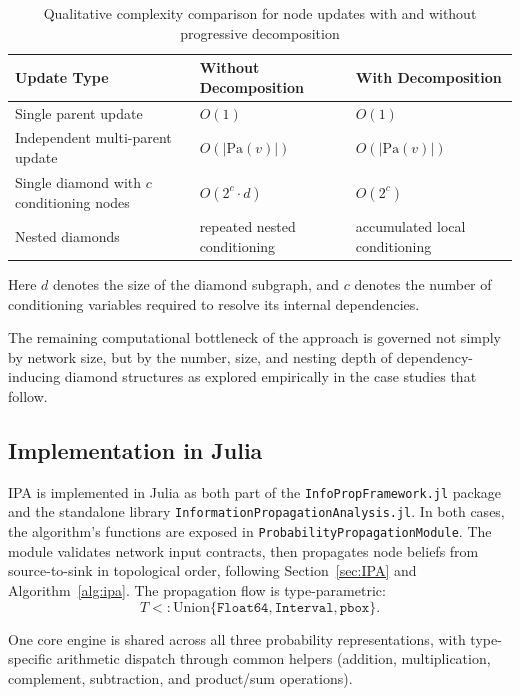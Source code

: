 \documentclass[preprint,12pt]{elsarticle}
\begin{document}
\begin{table}[ht]
\small
\caption{Qualitative complexity comparison for node updates with and without progressive decomposition}
\label{tab:complexity_comparison}
\centering
\begin{tabular}{p{4.5cm}p{4cm}p{4cm}}
\toprule
Update Type & Without Decomposition & With Decomposition \\
\midrule
Single parent update & $O(1)$ & $O(1)$ \\
Independent multi-parent update & $O(|\mathrm{Pa}(v)|)$ & $O(|\mathrm{Pa}(v)|)$ \\
Single diamond with $c$ conditioning nodes & $O(2^c \cdot d)$ & $O(2^c)$ \\
Nested diamonds & repeated nested conditioning & accumulated local conditioning \\
\bottomrule
\end{tabular}
\begin{minipage}{\textwidth}
\footnotesize
Here $d$ denotes the size of the diamond subgraph, and $c$ denotes the number of conditioning variables required to resolve its internal dependencies.
\end{minipage}
\end{table}

The remaining computational bottleneck of the approach is governed not simply by network size, but by the number, size, and nesting depth of dependency-inducing diamond structures as explored empirically in the case studies that follow.


\subsection{Implementation in Julia}

IPA is implemented in Julia as both part of the \texttt{InfoPropFramework.jl} package and the standalone library \texttt{InformationPropagationAnalysis.jl}. In both cases, the algorithm’s functions are exposed in \texttt{ProbabilityPropagationModule}. The module validates network input contracts, then propagates node beliefs from source-to-sink  in topological order, following Section~\ref{sec:IPA} and Algorithm~\ref{alg:ipa}.
The propagation flow is type-parametric:
\[
T <: \mathrm{Union}\{\texttt{Float64}, \texttt{Interval}, \texttt{pbox}\}.
\]


One core engine is shared across all three probability representations, with type-specific arithmetic dispatch through common helpers (addition, multiplication, complement, subtraction, and product/sum operations).
\end{document}

